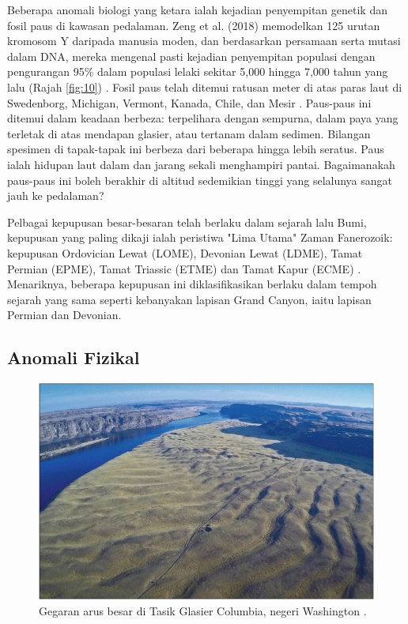 \documentclass[10pt,twocolumn,letterpaper]{article}
\begin{document}
Beberapa anomali biologi yang ketara ialah kejadian penyempitan genetik dan fosil paus di kawasan pedalaman. Zeng et al. (2018) memodelkan 125 urutan kromosom Y daripada manusia moden, dan berdasarkan persamaan serta mutasi dalam DNA, mereka mengenal pasti kejadian penyempitan populasi dengan pengurangan 95\% dalam populasi lelaki sekitar 5,000 hingga 7,000 tahun yang lalu (Rajah \ref{fig:10}) \cite{62}. Fosil paus telah ditemui ratusan meter di atas paras laut di Swedenborg, Michigan, Vermont, Kanada, Chile, dan Mesir \cite{63,64,65,66}. Paus-paus ini ditemui dalam keadaan berbeza: terpelihara dengan sempurna, dalam paya yang terletak di atas mendapan glasier, atau tertanam dalam sedimen. Bilangan spesimen di tapak-tapak ini berbeza dari beberapa hingga lebih seratus. Paus ialah hidupan laut dalam dan jarang sekali menghampiri pantai. Bagaimanakah paus-paus ini boleh berakhir di altitud sedemikian tinggi yang selalunya sangat jauh ke pedalaman?

Pelbagai kepupusan besar-besaran telah berlaku dalam sejarah lalu Bumi, kepupusan yang paling dikaji ialah peristiwa "Lima Utama" Zaman Fanerozoik: kepupusan Ordovician Lewat (LOME), Devonian Lewat (LDME), Tamat Permian (EPME), Tamat Triassic (ETME) dan Tamat Kapur (ECME) \cite{88,89}. Menariknya, beberapa kepupusan ini diklasifikasikan berlaku dalam tempoh sejarah yang sama seperti kebanyakan lapisan Grand Canyon, iaitu lapisan Permian dan Devonian.

\subsection{Anomali Fizikal}

\begin{figure}[b]
\begin{center}
   \includegraphics[width=1\linewidth]{columbia.jpg}
\end{center}
   \caption{Gegaran arus besar di Tasik Glasier Columbia, negeri Washington \cite{80}.}
\label{fig:11}
\label{fig:onecol}
\end{figure}
\end{document}
